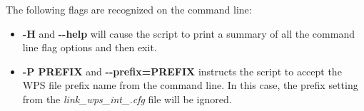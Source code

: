 \documentclass{article}
\begin{document}
The following flags are recognized on the command line:

\begin{itemize}

\item \textbf{-H} and \textbf{-{}-help} will cause the script to print 
a summary of all the command line flag options and then exit.

\item \textbf{-P PREFIX} and \textbf{-{}-prefix=PREFIX} instructs the script to
accept the WPS file prefix name from the command line.  In this case, the 
prefix setting from the \textit{link\_wps\_int\_.cfg} file will be ignored.

\end{itemize}



\end{document}
